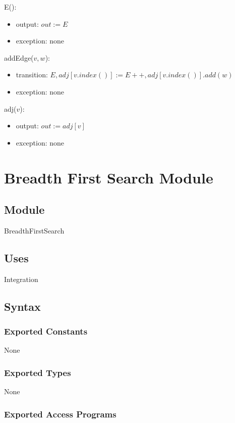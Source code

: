 \documentclass[12pt]{article}
\begin{document}
\noindent E():
\begin{itemize}
\item output: $out := E$
\item exception: none
\end{itemize}



\noindent addEdge($v, w$):
\begin{itemize}
\item transition: $E, adj[v.index()] := E++, adj[v.index()].add(w)$
\item exception: none
\end{itemize}



\noindent adj($v$):
\begin{itemize}
\item output: $out := adj[v]$
\item exception: none
\end{itemize}



\newpage
\section* {Breadth First Search Module}

\subsection*{Module}

BreadthFirstSearch

\subsection* {Uses}

Integration 

\subsection* {Syntax}
\subsubsection* {Exported Constants}
None



\subsubsection* {Exported Types}
None

\subsubsection* {Exported Access Programs}
\end{document}

